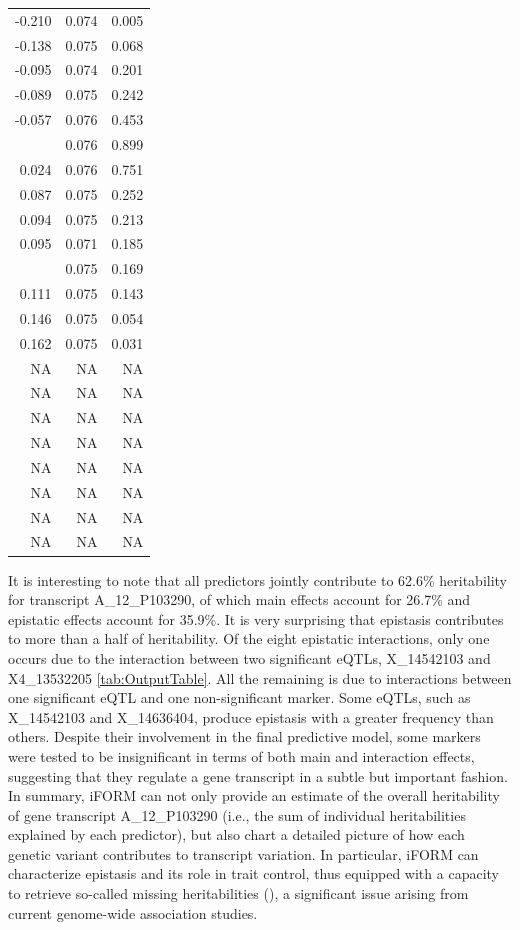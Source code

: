 \documentclass[11pt,]{book}
\theoremstyle{definition}
\theoremstyle{definition}
\theoremstyle{remark}
\begin{document}
\begin{table}
\begin{tabular}[t]{rrr}
\midrule
-0.210 & 0.074 & 0.005\\
-0.138 & 0.075 & 0.068\\
-0.095 & 0.074 & 0.201\\
-0.089 & 0.075 & 0.242\\
-0.057 & 0.076 & 0.453\\
\addlinespace
0.010 & 0.076 & 0.899\\
0.024 & 0.076 & 0.751\\
0.087 & 0.075 & 0.252\\
0.094 & 0.075 & 0.213\\
0.095 & 0.071 & 0.185\\
\addlinespace
0.104 & 0.075 & 0.169\\
0.111 & 0.075 & 0.143\\
0.146 & 0.075 & 0.054\\
0.162 & 0.075 & 0.031\\
NA & NA & NA\\
\addlinespace
NA & NA & NA\\
NA & NA & NA\\
NA & NA & NA\\
NA & NA & NA\\
NA & NA & NA\\
\addlinespace
NA & NA & NA\\
NA & NA & NA\\
\bottomrule
\end{tabular}
\end{table}

It is interesting to note that all predictors jointly contribute to
62.6\% heritability for transcript A\_12\_P103290, of which main effects
account for 26.7\% and epistatic effects account for 35.9\%. It is very
surprising that epistasis contributes to more than a half of
heritability. Of the eight epistatic interactions, only one occurs due
to the interaction between two significant eQTLs, X\_14542103 and
X4\_13532205 \ref{tab:OutputTable}. All the remaining is due to
interactions between one significant eQTL and one non-significant
marker. Some eQTLs, such as X\_14542103 and X\_14636404, produce
epistasis with a greater frequency than others. Despite their
involvement in the final predictive model, some markers were tested to
be insignificant in terms of both main and interaction effects,
suggesting that they regulate a gene transcript in a subtle but
important fashion. In summary, iFORM can not only provide an estimate of
the overall heritability of gene transcript A\_12\_P103290 (i.e., the
sum of individual heritabilities explained by each predictor), but also
chart a detailed picture of how each genetic variant contributes to
transcript variation. In particular, iFORM can characterize epistasis
and its role in trait control, thus equipped with a capacity to retrieve
so-called missing heritabilities (\cite{manolio2009finding}), a
significant issue arising from current genome-wide association studies.
\end{document}

